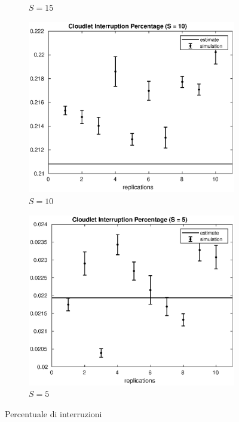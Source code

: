 \begin{figure}[!h]
\begin{subfigure}[t]{0.49\textwidth}
\caption{$S = 15$}
\label{15_intperc}
\end{subfigure}
%
\begin{subfigure}[t]{0.49\textwidth}
\includegraphics[width=\textwidth]{figures/simul/10_500K_intperc}
\caption{$S = 10$}
\label{10_intperc}
\end{subfigure}
%
\begin{subfigure}[t]{0.49\textwidth}
\includegraphics[width=\textwidth]{figures/simul/5_500K_intperc}
\caption{$S = 5$}
\label{5_intperc}
\end{subfigure}
%
\caption{Percentuale di interruzioni}
\label{plot:intperc}
\end{figure}
%
%

